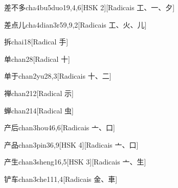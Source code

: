 \begin{entry}{差不多}{cha4bu5duo1}{9,4,6}[HSK 2][Radicais ⼯、⼀、⼣]
\end{entry}

\begin{entry}{差点儿}{cha4dian3r5}{9,9,2}[Radicais ⼯、⽕、⼉]
\end{entry}

\begin{entry}{拆}{chai1}{8}[Radical ⼿]
\end{entry}

\begin{entry}{单}{chan2}{8}[Radical ⼗]
\end{entry}

\begin{entry}{单于}{chan2yu2}{8,3}[Radicais ⼗、⼆]
\end{entry}

\begin{entry}{禅}{chan2}{12}[Radical ⽰]
\end{entry}

\begin{entry}{蝉}{chan2}{14}[Radical ⾍]
\end{entry}

\begin{entry}{产后}{chan3hou4}{6,6}[Radicais ⼇、⼝]
\end{entry}

\begin{entry}{产品}{chan3pin3}{6,9}[HSK 4][Radicais ⼇、⼝]
\end{entry}

\begin{entry}{产生}{chan3sheng1}{6,5}[HSK 3][Radicais ⼇、⽣]
\end{entry}

\begin{entry}{铲车}{chan3che1}{11,4}[Radicais ⾦、⾞]
\end{entry}

